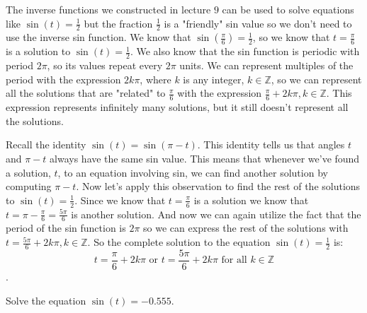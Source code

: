 \label{les_10:solving_trig_equations}

The inverse functions we constructed in lecture $9$ can be used to solve
equations like $\sin(t) = \frac{1}{2}$ but the fraction $\frac{1}{2}$ is a
"friendly" sin value so we don't need to use the inverse sin function. We know
that $\sin (\frac{\pi}{6}) = \frac{1}{2}$, so we know that $t = \frac{\pi}{6}$
is a solution to $\sin(t) = \frac{1}{2}$. We also know that the sin function is
periodic with period $2\pi$, so its values repeat every $2\pi$ units. We can
represent multiples of the period with the expression $2k\pi$, where $k$ is any
integer, $k \in \mathbb{Z}$, so we can represent all the solutions that
are "related" to $\frac{\pi}{6}$ with the expression $\frac{\pi}{6} + 2k\pi, k
\in \mathbb{Z}$. This expression represents infinitely many solutions, but
it still doesn't represent all the solutions.

Recall the identity $\sin (t) = \sin (\pi - t)$. This identity tells us that
angles $t$ and $\pi - t$ always have the same sin value. This means that
whenever we've found a solution, $t$, to an equation involving sin, we can find
another solution by computing $\pi - t$. Now let's apply this observation to
find the rest of the solutions to $\sin(t) = \frac{1}{2}$. Since we know that
$t = \frac{\pi}{6}$ is a solution we know that $t = \pi - \frac{\pi}{6} =
\frac{5\pi}{6}$ is another solution. And now we can again utilize the fact that
the period of the sin function is $2\pi$ so we can express the rest of the
solutions with $t = \frac{5\pi}{6} + 2k\pi, k \in \mathbb{Z}$. So the complete
solution to the equation $\sin (t) = \frac{1}{2}$ is:
\[
t = \frac{\pi}{6} + 2k\pi \textrm{ or } t = \frac{5\pi}{6} + 2k\pi \textrm{ for
all } k \in \mathbb{Z}
\].

\begin{exc}
  \label{exc:inv_sin_2}

  Solve the equation $\sin(t) = -0.555$.
\end{exc}

\newpage
